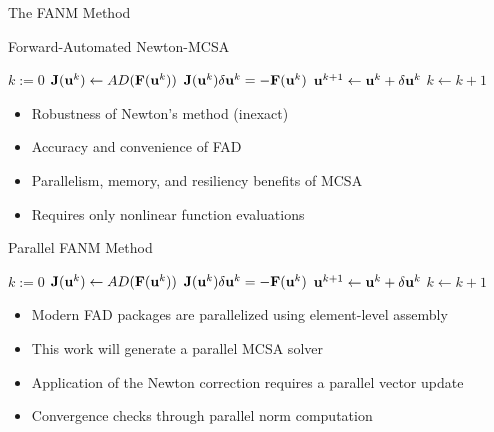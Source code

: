 \documentclass{beamer}
\begin{document}
\begin{frame}[fragile]{The FANM Method}

  Forward-Automated Newton-MCSA

  \begin{algorithm}[H]
    \begin{algorithmic}[1]
      \STATE $k := 0$ 
      \STATE $\mathbf{J}(\mathbf{u}^{k}) \leftarrow AD(\mathbf{F}(\mathbf{u}^k))$ 
      \STATE $\mathbf{J}(\mathbf{u}^k) \delta \mathbf{u}^k = -\mathbf{F}(\mathbf{u}^{k})$
      \STATE $\mathbf{u}^{k+1} \leftarrow \mathbf{u}^k + \delta \mathbf{u}^k$ 
      \STATE $k \leftarrow k+1$ 
      \ENDWHILE
    \end{algorithmic}
    \caption{FANM}
  \end{algorithm}

  \begin{itemize}
  \item Robustness of Newton's method (inexact)
  \item Accuracy and convenience of FAD
  \item Parallelism, memory, and resiliency benefits of MCSA
  \item Requires only nonlinear function evaluations
  \end{itemize}


\end{frame}

\begin{frame}{Parallel FANM Method}

  \begin{algorithm}[H]
    \begin{algorithmic}[1]
      \STATE $k := 0$ 
      \STATE $\mathbf{J}(\mathbf{u}^{k}) \leftarrow AD(\mathbf{F}(\mathbf{u}^k))$ 
      \STATE $\mathbf{J}(\mathbf{u}^k) \delta \mathbf{u}^k = -\mathbf{F}(\mathbf{u}^{k})$
      \STATE $\mathbf{u}^{k+1} \leftarrow \mathbf{u}^k + \delta \mathbf{u}^k$ 
      \STATE $k \leftarrow k+1$ 
      \ENDWHILE
    \end{algorithmic}
    \caption{FANM}
  \end{algorithm}

  \begin{itemize}
  \item Modern FAD packages are parallelized using element-level
    assembly
  \item This work will generate a parallel MCSA solver
  \item Application of the Newton correction requires a parallel
    vector update
  \item Convergence checks through parallel norm computation
  \end{itemize}

\end{frame}
\end{document}
